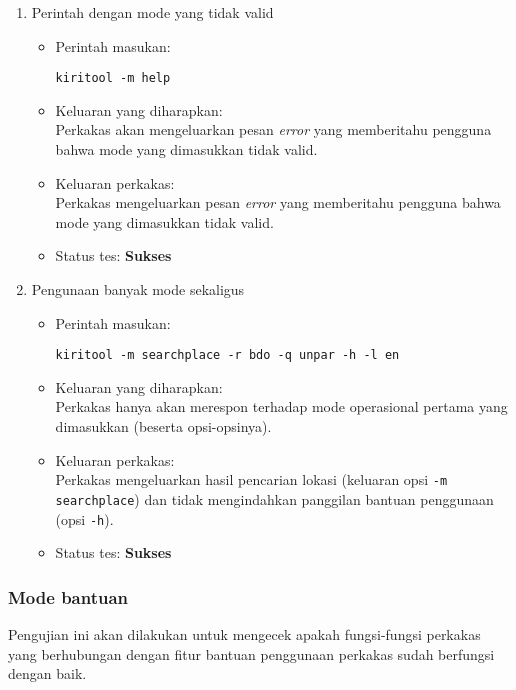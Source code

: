 \begin{enumerate}
	\item Perintah dengan mode yang tidak valid
	\begin{itemize}
		\item Perintah masukan:
		\begin{verbatim}
kiritool -m help
		\end{verbatim}
		\item Keluaran yang diharapkan: \\
		Perkakas akan mengeluarkan pesan \textit{error} yang memberitahu pengguna bahwa mode yang dimasukkan tidak valid.
		\item Keluaran perkakas: \\
		Perkakas mengeluarkan pesan \textit{error} yang memberitahu pengguna bahwa mode yang dimasukkan tidak valid.
		\item Status tes: \textbf{Sukses}
	\end{itemize}
	
	\item Pengunaan banyak mode sekaligus
	\begin{itemize}
		\item Perintah masukan:
		\begin{verbatim}
kiritool -m searchplace -r bdo -q unpar -h -l en
		\end{verbatim}
		\item Keluaran yang diharapkan: \\
		Perkakas hanya akan merespon terhadap mode operasional pertama yang dimasukkan (beserta opsi-opsinya).
		\item Keluaran perkakas: \\
		Perkakas mengeluarkan hasil pencarian lokasi (keluaran opsi \verb|-m searchplace|) dan tidak mengindahkan panggilan bantuan penggunaan (opsi \verb|-h|).
		\item Status tes: \textbf{Sukses}
	\end{itemize}

\end{enumerate}

\subsubsection{Mode bantuan}
\label{sec:testing-experiments-testing-help}

Pengujian ini akan dilakukan untuk mengecek apakah fungsi-fungsi perkakas yang berhubungan dengan fitur bantuan penggunaan perkakas sudah berfungsi dengan baik.

